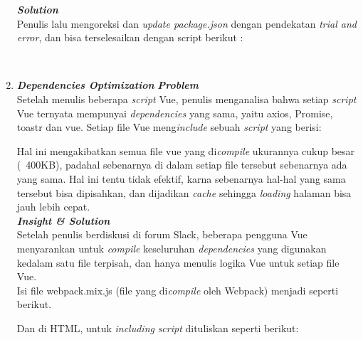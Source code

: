 \begin{enumerate}
  \textbf{\textit{Solution}} \\
  Penulis lalu mengoreksi dan \textit{update package.json} dengan pendekatan \textit{trial and error}, dan bisa terselesaikan dengan script berikut :
		  	

			  	
	\ \\		  
\item 
	\textbf{\textit{Dependencies Optimization}} \textbf{\textit{Problem}} \\
	Setelah menulis beberapa \textit{script} Vue, penulis menganalisa bahwa setiap \textit{script} Vue ternyata mempunyai \textit{dependencies} yang sama, yaitu axios, Promise, toastr dan vue. Setiap file Vue meng\textit{include} sebuah \textit{script} yang berisi:
	

	Hal ini mengakibatkan semua file vue yang di\textit{compile} ukurannya cukup besar (~400KB), padahal sebenarnya di dalam setiap file tersebut sebenarnya ada yang sama. Hal ini tentu tidak efektif, karna sebenarnya hal-hal yang sama tersebut bisa dipisahkan, dan dijadikan \textit{cache} sehingga \textit{loading} halaman bisa jauh lebih cepat.\\
		
	\textbf{\textit{Insight \& Solution}} \\
	Setelah penulis berdiskusi di forum Slack, beberapa pengguna Vue menyarankan untuk \textit{compile} keseluruhan \textit{dependencies} yang digunakan kedalam satu file terpisah, dan hanya menulis logika Vue untuk setiap file Vue.\\
	Isi file webpack.mix.js (file yang di\textit{compile} oleh Webpack)	menjadi seperti berikut.
	
		
	Dan di HTML, untuk \textit{including} \textit{script} dituliskan seperti berikut:
	

\end{enumerate}